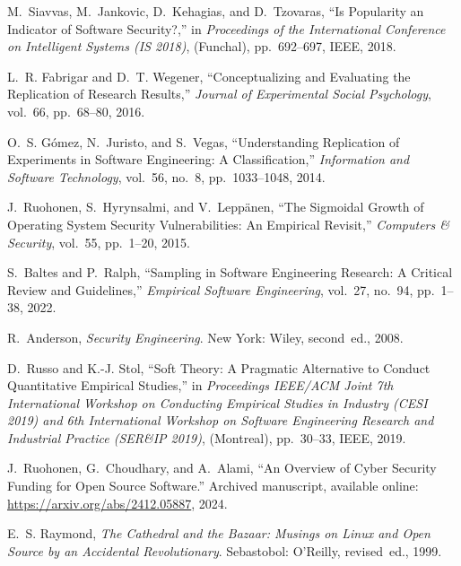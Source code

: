 \documentclass[5p, twocolumn, numbers, sort]{elsarticle}
\begin{document}
\begin{thebibliography}{10}

M.~Siavvas, M.~Jankovic, D.~Kehagias, and D.~Tzovaras, ``{I}s {P}opularity an
  {I}ndicator of {S}oftware {S}ecurity?,'' in {\em Proceedings of the
  International Conference on Intelligent Systems (IS 2018)}, (Funchal),
  pp.~692--697, IEEE, 2018.

L.~R. Fabrigar and D.~T. Wegener, ``{C}onceptualizing and {E}valuating the
  {R}eplication of {R}esearch {R}esults,'' {\em Journal of Experimental Social
  Psychology}, vol.~66, pp.~68--80, 2016.

O.~S. G\'omez, N.~Juristo, and S.~Vegas, ``{U}nderstanding {R}eplication of
  {E}xperiments in {S}oftware {E}ngineering: {A} {C}lassification,'' {\em
  Information and Software Technology}, vol.~56, no.~8, pp.~1033--1048, 2014.

J.~Ruohonen, S.~Hyrynsalmi, and V.~Lepp\"anen, ``{T}he {S}igmoidal {G}rowth of
  {O}perating {S}ystem {S}ecurity {V}ulnerabilities: {A}n {E}mpirical
  {R}evisit,'' {\em Computers \& Security}, vol.~55, pp.~1--20, 2015.

S.~Baltes and P.~Ralph, ``{S}ampling in {S}oftware {E}ngineering {R}esearch:
  {A} {C}ritical {R}eview and {G}uidelines,'' {\em Empirical Software
  Engineering}, vol.~27, no.~94, pp.~1--38, 2022.

R.~Anderson, {\em {S}ecurity {E}ngineering}.
\newblock New York: Wiley, second~ed., 2008.

D.~Russo and K.-J. Stol, ``{S}oft {T}heory: {A} {P}ragmatic {A}lternative to
  {C}onduct {Q}uantitative {E}mpirical {S}tudies,'' in {\em Proceedings
  IEEE/ACM Joint 7th International Workshop on Conducting Empirical Studies in
  Industry (CESI 2019) and 6th International Workshop on Software Engineering
  Research and Industrial Practice (SER\&IP 2019)}, (Montreal), pp.~30--33,
  IEEE, 2019.

J.~Ruohonen, G.~Choudhary, and A.~Alami, ``{A}n {O}verview of {C}yber
  {S}ecurity {F}unding for {O}pen {S}ource {S}oftware.'' {A}rchived manuscript,
  available online: \url{https://arxiv.org/abs/2412.05887}, 2024.

E.~S. Raymond, {\em {T}he {C}athedral and the {B}azaar: {M}usings on {L}inux
  and {O}pen {S}ource by an {A}ccidental {R}evolutionary}.
\newblock Sebastobol: O'Reilly, revised~ed., 1999.


\end{thebibliography}
\end{document}
